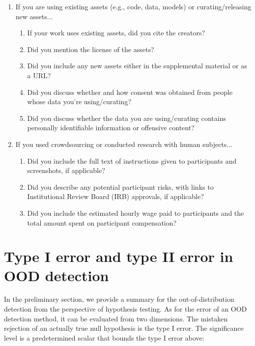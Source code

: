 \documentclass{article}
\begin{document}
\begin{enumerate}
\item If you are using existing assets (e.g., code, data, models) or curating/releasing new assets...
\begin{enumerate}
  \item If your work uses existing assets, did you cite the creators?
  \item Did you mention the license of the assets?
    \answerNA{}
  \item Did you include any new assets either in the supplemental material or as a URL?
    \answerNA{}
  \item Did you discuss whether and how consent was obtained from people whose data you're using/curating?
    \answerNA{}
  \item Did you discuss whether the data you are using/curating contains personally identifiable information or offensive content?
    \answerNA{}
\end{enumerate}


\item If you used crowdsourcing or conducted research with human subjects...
\begin{enumerate}
  \item Did you include the full text of instructions given to participants and screenshots, if applicable?
    \answerNA{}
  \item Did you describe any potential participant risks, with links to Institutional Review Board (IRB) approvals, if applicable?
    \answerNA{}
  \item Did you include the estimated hourly wage paid to participants and the total amount spent on participant compensation?
    \answerNA{}
\end{enumerate}


\end{enumerate}










\appendix



\section{Type I error and type II error in OOD detection}\label{App:TypeError}
In the preliminary section, we provide a summary for the out-of-distribution detection from the perspective of hypothesis testing. As for the error of an OOD detection method, it can be evaluated from two dimensions.
The mistaken rejection of an actually true null hypothesis  is the type I error. 
The significance level  is a predetermined scalar that bounds the type I error above:
\end{document}
